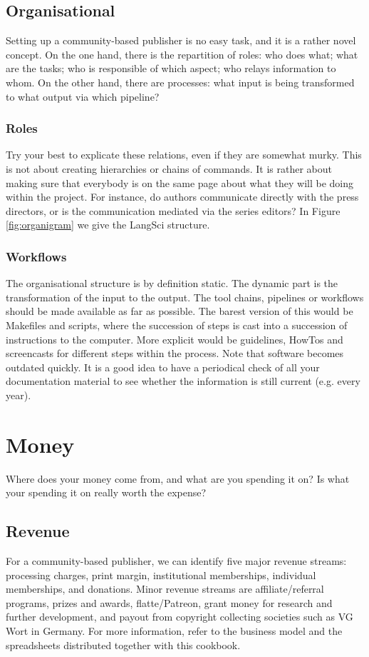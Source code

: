 \documentclass[guidelines,nonflat,modfonts] {langsci/langscibook}
\begin{document}
\subsection{Organisational}
Setting up a community-based publisher is no easy task, and it is a rather novel concept. On the one hand, there is the repartition of roles: who does what; what are the tasks; who is responsible of which aspect; who relays information to whom. On the other hand, there are processes: what input is being transformed to what output via which pipeline?

\subsubsection{Roles}

Try your best to explicate these relations, even if they are somewhat murky. This is not about creating hierarchies or chains of commands. It is rather about making sure that everybody is on the same page about what they will be doing within the project. For instance, do authors communicate directly with the press directors, or is the communication mediated via the series editors? In Figure \ref{fig:organigram} we give the LangSci structure. 


\subsubsection{Workflows}
The organisational structure is by definition static. The dynamic part is the transformation of the input to the output. The tool chains, pipelines or workflows should be made available as far as possible. The barest version of this would be Makefiles and scripts, where the succession of steps is cast into a succession of instructions to the computer. More explicit would be guidelines, HowTos and screencasts for different steps within the process. Note that software becomes outdated quickly. It is a good idea to have a periodical check of all your documentation material to see whether the information is still current (e.g. every year). 

\section{Money}
Where does your money come from, and what are you spending it on? Is what your spending it on really worth the expense? 
\subsection{Revenue}
For a community-based publisher, we can identify five major revenue streams: processing charges, print margin, institutional memberships, individual memberships, and donations. 
Minor revenue streams are affiliate/referral programs, prizes and awards, flatte/Patreon, grant money for research and further development, and payout from copyright collecting societies such as VG Wort in Germany. 
For more information, refer to the business model and the spreadsheets distributed together with this cookbook. 
\end{document}
